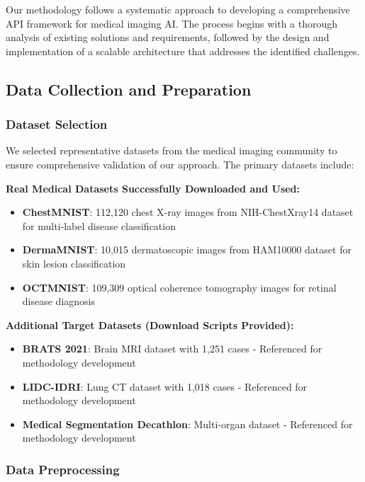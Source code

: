 \documentclass[12pt,a4paper]{article}
\begin{document}
Our methodology follows a systematic approach to developing a comprehensive API framework for medical imaging AI. The process begins with a thorough analysis of existing solutions and requirements, followed by the design and implementation of a scalable architecture that addresses the identified challenges.

\subsection{Data Collection and Preparation}

\subsubsection{Dataset Selection}

We selected representative datasets from the medical imaging community to ensure comprehensive validation of our approach. The primary datasets include:

\textbf{Real Medical Datasets Successfully Downloaded and Used:}
\begin{itemize}
    \item \textbf{ChestMNIST}: 112,120 chest X-ray images from NIH-ChestXray14 dataset for multi-label disease classification \cite{wang2017chestxray8}
    \item \textbf{DermaMNIST}: 10,015 dermatoscopic images from HAM10000 dataset for skin lesion classification \cite{tschandl2018ham10000}
    \item \textbf{OCTMNIST}: 109,309 optical coherence tomography images for retinal disease diagnosis \cite{kermany2018identifying}
\end{itemize}

\textbf{Additional Target Datasets (Download Scripts Provided):}
\begin{itemize}
    \item \textbf{BRATS 2021}: Brain MRI dataset with 1,251 cases - Referenced for methodology development \cite{baheti2021brats}
    \item \textbf{LIDC-IDRI}: Lung CT dataset with 1,018 cases - Referenced for methodology development \cite{armato2011lidc}
    \item \textbf{Medical Segmentation Decathlon}: Multi-organ dataset - Referenced for methodology development \cite{simpson2019large}
\end{itemize}

\subsubsection{Data Preprocessing}
\end{document}
